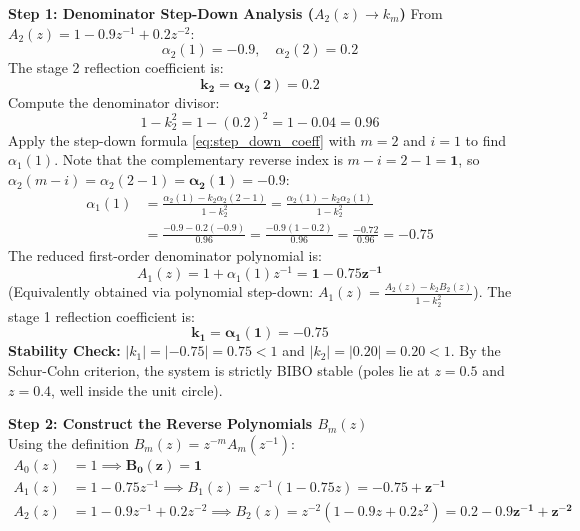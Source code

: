 \documentclass[11pt,a4paper]{article}
\begin{document}
\vspace{1mm}
\noindent\textbf{Step 1: Denominator Step-Down Analysis ($A_2(z) \to k_m$)}
From $A_2(z) = 1 - 0.9 z^{-1} + 0.2 z^{-2}$:
\begin{equation}
\alpha_2(1) = -0.9, \quad \alpha_2(2) = 0.2
\end{equation}
The stage 2 reflection coefficient is:
\begin{equation}
\mathbf{k_2 = \alpha_2(2) = 0.2}
\end{equation}
Compute the denominator divisor:
\begin{equation}
1 - k_2^2 = 1 - (0.2)^2 = 1 - 0.04 = 0.96
\end{equation}
Apply the step-down formula \eqref{eq:step_down_coeff} with $m = 2$ and $i = 1$ to find $\alpha_1(1)$. Note that the complementary reverse index is $m - i = 2 - 1 = \mathbf{1}$, so $\alpha_2(m-i) = \alpha_2(2-1) = \mathbf{\alpha_2(1) = -0.9}$:
\begin{align}
\alpha_1(1) &= \frac{\alpha_2(1) - k_2 \alpha_2(2 - 1)}{1 - k_2^2} = \frac{\alpha_2(1) - k_2 \alpha_2(1)}{1 - k_2^2} \nonumber \\
&= \frac{-0.9 - 0.2(-0.9)}{0.96} = \frac{-0.9(1 - 0.2)}{0.96} = \frac{-0.72}{0.96} = \mathbf{-0.75}
\end{align}
The reduced first-order denominator polynomial is:
\begin{equation}
A_1(z) = 1 + \alpha_1(1) z^{-1} = \mathbf{1 - 0.75 z^{-1}}
\end{equation}
(Equivalently obtained via polynomial step-down: $A_1(z) = \frac{A_2(z) - k_2 B_2(z)}{1 - k_2^2}$). The stage 1 reflection coefficient is:
\begin{equation}
\mathbf{k_1 = \alpha_1(1) = -0.75}
\end{equation}
\textbf{Stability Check:} $|k_1| = |-0.75| = 0.75 < 1$ and $|k_2| = |0.20| = 0.20 < 1$. By the Schur-Cohn criterion, the system is strictly BIBO stable (poles lie at $z = 0.5$ and $z = 0.4$, well inside the unit circle).

\vspace{1mm}
\noindent\textbf{Step 2: Construct the Reverse Polynomials $B_m(z)$}\\[1mm]
Using the definition $B_m(z) = z^{-m} A_m(z^{-1})$:
\begin{align}
A_0(z) &= 1 \implies \mathbf{B_0(z) = 1} \\
A_1(z) &= 1 - 0.75 z^{-1} \implies B_1(z) = z^{-1}(1 - 0.75 z) = \mathbf{-0.75 + z^{-1}} \\
A_2(z) &= 1 - 0.9 z^{-1} + 0.2 z^{-2} \implies B_2(z) = z^{-2}(1 - 0.9 z + 0.2 z^2) = \mathbf{0.2 - 0.9 z^{-1} + z^{-2}}
\end{align}
\end{document}
